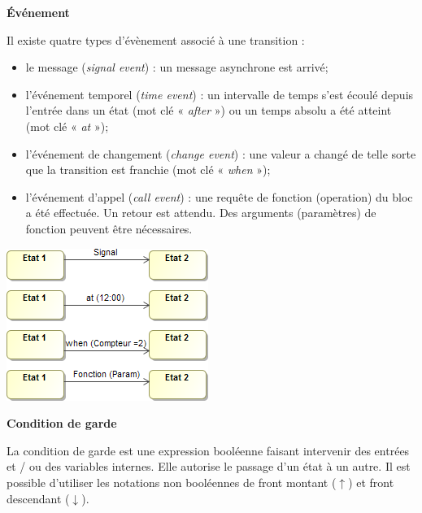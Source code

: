 \documentclass[10pt]{article}
\begin{document}
\begin{defi}
\begin{minipage}[c]{.55\linewidth}
\textbf{Événement}

Il existe quatre types d’évènement associé à une transition :
\begin{itemize}
\item le message (\textit{signal event}) : un message asynchrone est arrivé;
\item l'événement temporel (\textit{time event}) : un intervalle de temps s’est écoulé depuis l’entrée dans un état (mot clé « \textit{after} ») ou un temps absolu a été atteint (mot clé « \textit{at} »);
\item l'événement de changement (\textit{change event}) : une valeur a changé de telle sorte que la transition est franchie (mot clé « \textit{when} »);
\item l'événement d’appel (\textit{call event}) : une requête de fonction (operation) du bloc a été effectuée. Un retour est attendu. Des arguments (paramètres) de fonction peuvent être nécessaires.
\end{itemize}
\end{minipage} \hfill
\begin{minipage}[c]{.4 \linewidth}
\begin{center}
\includegraphics[width=.95\textwidth]{images/evenements}
\end{center}
\end{minipage}
\end{defi}



\begin{defi}
\textbf{Condition de garde}

La condition de garde est une expression booléenne faisant intervenir des entrées et / ou des variables internes. Elle autorise le passage d’un état à un autre. Il est possible d’utiliser les notations non booléennes de front montant ($\uparrow$) et front descendant ($\downarrow$).
\end{defi}
\end{document}
